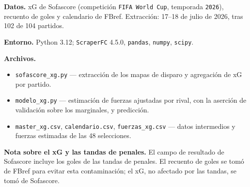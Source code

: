 \documentclass[11pt,a4paper]{article}
\begin{document}
\textbf{Datos.} xG de Sofascore (competición \texttt{FIFA World Cup}, temporada \texttt{2026}), recuento de goles y calendario de FBref. Extracción: 17--18 de julio de 2026, tras 102 de 104 partidos.

\textbf{Entorno.} Python 3.12; \texttt{ScraperFC} 4.5.0, \texttt{pandas}, \texttt{numpy}, \texttt{scipy}.

\textbf{Archivos.}
\begin{itemize}
\item \texttt{sofascore\_xg.py} --- extracción de los mapas de disparo y agregación de xG por partido.
\item \texttt{modelo\_xg.py} --- estimación de fuerzas ajustadas por rival, con la aserción de validación sobre los marginales, y predicción.
\item \texttt{master\_xg.csv}, \texttt{calendario.csv}, \texttt{fuerzas\_xg.csv} --- datos intermedios y fuerzas estimadas de las 48 selecciones.
\end{itemize}

\textbf{Nota sobre el xG y las tandas de penales.} El campo de resultado de Sofascore incluye los goles de las tandas de penales. El recuento de goles se tomó de FBref para evitar esta contaminación; el xG, no afectado por las tandas, se tomó de Sofascore.


\end{document}
